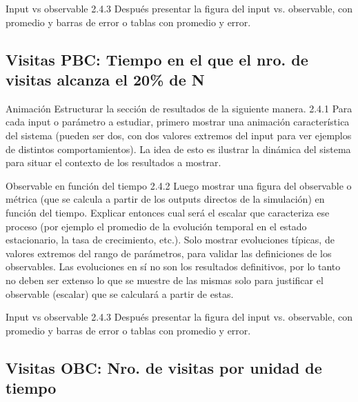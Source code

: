 \documentclass{beamer}
\begin{document}
    \begin{frame}{Input vs observable}
        2.4.3 Después presentar la figura del input vs. observable, con promedio y barras de error o tablas
        con promedio y error.
    \end{frame}

    \subsection[Visitas PBC]{Visitas PBC: Tiempo en el que el nro. de visitas alcanza el 20\% de N}

    \begin{frame}{Animación}
        Estructurar la sección de resultados de la siguiente manera.
        2.4.1 Para cada input o parámetro a estudiar, primero mostrar una animación característica del
        sistema (pueden ser dos, con dos valores extremos del input para ver ejemplos de distintos
        comportamientos). La idea de esto es ilustrar la dinámica del sistema para situar el contexto de los
        resultados a mostrar.
    \end{frame}

    \begin{frame}{Observable en función del tiempo}
        2.4.2 Luego mostrar una figura del observable o métrica (que se calcula a partir de los outputs
        directos de la simulación) en función del tiempo. Explicar entonces cual será el escalar que
        caracteriza ese proceso (por ejemplo el promedio de la evolución temporal en el estado
        estacionario, la tasa de crecimiento, etc.). Solo mostrar evoluciones típicas, de valores extremos
        del rango de parámetros, para validar las definiciones de los observables. Las evoluciones en sí
        no son los resultados definitivos, por lo tanto no deben ser extenso lo que se muestre de las
        mismas solo para justificar el observable (escalar) que se calculará a partir de estas.
    \end{frame}

    \begin{frame}{Input vs observable}
        2.4.3 Después presentar la figura del input vs. observable, con promedio y barras de error o tablas
        con promedio y error.
    \end{frame}

    \subsection[Visitas OBC]{Visitas OBC: Nro. de visitas por unidad de tiempo}
\end{document}
